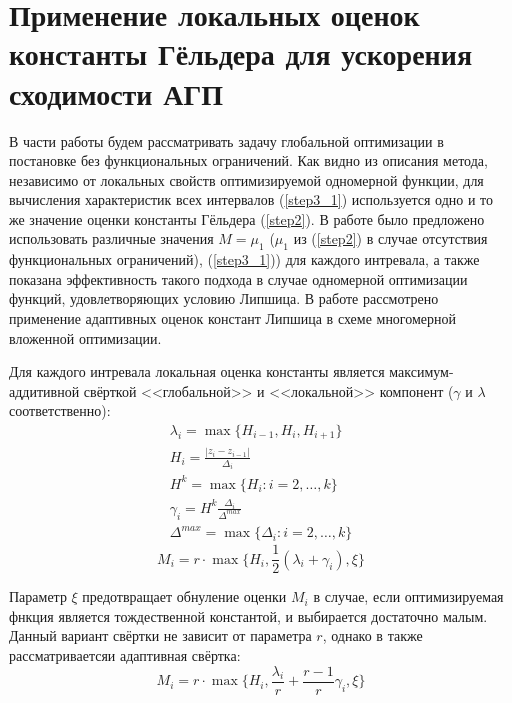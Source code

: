 \section{Применение локальных оценок константы Гёльдера для ускорения сходимости АГП}
В части работы будем рассматривать задачу глобальной оптимизации в постановке без функциональных ограничений.
Как видно из описания метода, независимо от локальных свойств оптимизируемой одномерной
функции, для вычисления характеристик всех интервалов (\ref{step3_1}) используется одно и то же
значение оценки константы Гёльдера (\ref{step2}). В работе \cite{sergLocalTuningFirst} было предложено использовать различные
значения \(M=\mu_1\) (\(\mu_1\) из (\ref{step2}) в случае отсутствия функциональных ограничений), (\ref{step3_1})) для каждого интревала, а
также показана эффективность такого подхода в случае одномерной оптимизации функций,
удовлетворяющих условию Липшица. В работе \cite{nestedLocal} рассмотрено применение
адаптивных оценок констант Липшица в схеме многомерной вложенной оптимизации.

Для каждого интревала локальная оценка константы является максимум-аддитивной свёрткой
<<глобальной>> и <<локальной>> компонент (\(\gamma\) и \(\lambda\) соответственно):
\begin{displaymath}
  \begin{array}{lr}
    \lambda_i=\max\{H_{i-1},H_i,H_{i+1}\} \\
    H_i=\frac{|z_i-z_{i-1}|}{\Delta_i} \\
    H^k=\max\{H_i:i=2,\dots ,k\} \\
    \gamma_i=H^k\frac{\Delta_i}{\Delta^{max}} \\
    \Delta^{max}=\max\{\Delta_{i}:i=2,\dots ,k\}
  \end{array}
\end{displaymath}
\begin{equation}
\label{additiveConv}
M_i=r\cdot \max\{H_i, \frac{1}{2}(\lambda_i+\gamma_i),\xi\}
\end{equation}

Параметр \(\xi\) предотвращает обнуление оценки \(M_i\) в случае, если оптимизируемая
фнкция является тождественной константой, и выбирается достаточно малым.
Данный вариант свёртки не зависит от параметра \(r\), однако в \cite{sergLocalTuning}
также рассматриваетсяи адаптивная свёртка:
\begin{equation}
\label{additiveAdaptiveConv}
M_i=r\cdot \max\{H_i, \frac{\lambda_i}{r}+\frac{r-1}{r}\gamma_i,\xi\}
\end{equation}

